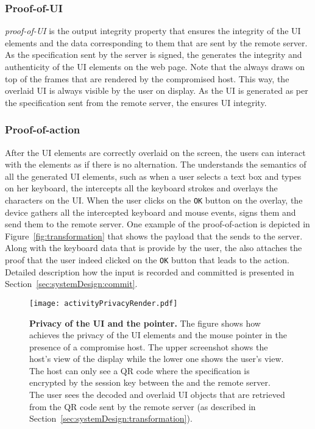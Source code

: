 \subsubsection{Proof-of-UI} \emph{proof-of-UI} is the output integrity property that ensures the integrity of the UI elements and the data corresponding to them that are sent by the remote server. As the specification sent by the server is signed, the \device generates the integrity and authenticity of the UI elements on the web page. Note that the \device always draws on top of the frames that are rendered by the compromised host. This way, the overlaid UI is always visible by the user on display. As the UI is generated as per the specification sent from the remote server, the \device ensures UI integrity.

\subsubsection{Proof-of-action} After the UI elements are correctly overlaid on the screen, the users can interact with the elements as if there is no alternation. The \device understands the semantics of all the generated UI elements, such as when a user selects a text box and types on her keyboard, the \device intercepts all the keyboard strokes and overlays the characters on the UI. When the user clicks on the \texttt{OK} button on the overlay, the device gathers all the intercepted keyboard and mouse events, signs them and send them to the remote server. One example of the proof-of-action is depicted in Figure~\ref{fig:transformation} that shows the payload that the \device sends to the server. Along with the keyboard data that is provide by the user, the \device also attaches the proof that the user indeed clicked on the \texttt{OK} button that leads to the action. Detailed description how the input is recorded and committed is presented in Section~\ref{sec:systemDesign:commit}.

\begin{figure}[t]
\centering
\texttt{[image: activityPrivacyRender.pdf]}
\caption{\textbf{Privacy of the UI and the pointer.} The figure shows how \name achieves the privacy of the UI elements and the mouse pointer in the presence of a compromise host. The upper screenshot shows the host's view of the display while the lower one shows the user's view. The host can only see a QR code where the specification is encrypted by the \tls session key between the \device and the remote server. The user sees the decoded and overlaid UI objects that are retrieved from the QR code sent by the remote server (as described in Section~\ref{sec:systemDesign:transformation}).}
\label{fig:activityPrivacy}
\centering
\end{figure}



